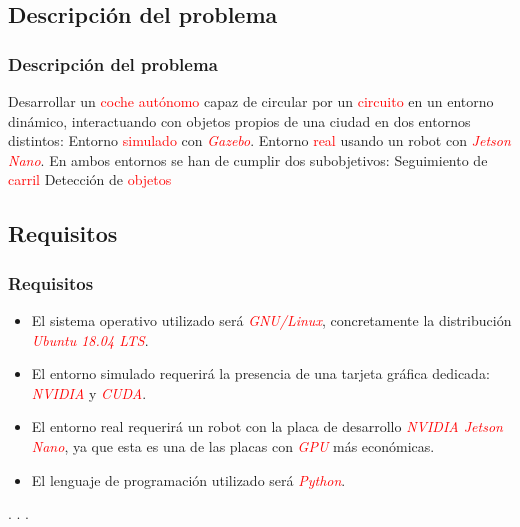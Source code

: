 \documentclass{beamer}
\begin{document}
\subsection{Descripción del problema}
\begin{frame}
	\frametitle{Descripción del problema}
	\begin{outline}
		\1 Desarrollar un \textcolor{red}{coche autónomo} capaz de circular por un \textcolor{red}{circuito} en un entorno dinámico, interactuando con objetos propios de
		una ciudad en dos entornos
		distintos:
		\2 Entorno \textcolor{red}{simulado} con \textcolor{red}{\textit{Gazebo}}.
		\2 Entorno \textcolor{red}{real} usando un robot con \textcolor{red}{\textit{Jetson Nano}}.
		\1 En ambos entornos se han de cumplir dos subobjetivos:
		\2 Seguimiento de \textcolor{red}{carril}
		\2 Detección de \textcolor{red}{objetos}
	\end{outline}
\end{frame}

\subsection{Requisitos}
\begin{frame}
	\frametitle{Requisitos}
	\begin{itemize}
		\item El sistema operativo utilizado será \textcolor{red}{\textit{GNU/Linux}}, concretamente la distribución \textcolor{red}{\textit{Ubuntu 18.04 LTS}}.
		\item El entorno simulado requerirá la presencia de una tarjeta gráfica dedicada: \textcolor{red}{\textit{NVIDIA}} y \textcolor{red}{\textit{CUDA}}.
		\item El entorno real requerirá un robot con la placa de desarrollo \textcolor{red}{\textit{NVIDIA Jetson Nano}}, ya que esta es una de las placas con
		      \textcolor{red}{\textit{GPU}} más económicas.
		\item El lenguaje de programación utilizado será \textcolor{red}{\textit{Python}}.
	\end{itemize}
	.
	.
	.
\end{frame}
\end{document}
